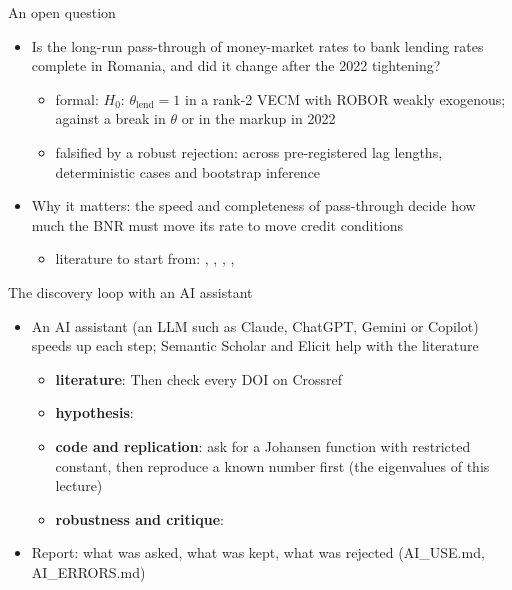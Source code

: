 \begin{frame}{An open question}
\itemsize{\small}
\begin{itemize}
    \item Is the long-run pass-through of money-market rates to bank lending rates complete in Romania, and did it change after the 2022 tightening?
    \begin{itemize}
        \item formal: $H_0$: $\theta_{\text{lend}} = 1$ in a rank-2 VECM with ROBOR weakly exogenous; against a break in $\theta$ or in the markup in 2022
        \item falsified by a robust rejection: across pre-registered lag lengths, deterministic cases and bootstrap inference
    \end{itemize}
    \item Why it matters: the speed and completeness of pass-through decide how much the BNR must move its rate to move credit conditions
    \begin{itemize}
        \item literature to start from: , , , , 
    \end{itemize}
\end{itemize}
\end{frame}

\begin{frame}{The discovery loop with an AI assistant}
\itemsize{\footnotesize}
\begin{itemize}
    \item An AI assistant (an LLM such as Claude, ChatGPT, Gemini or Copilot) speeds up each step; Semantic Scholar and Elicit help with the literature
    \begin{itemize}
        \item \textbf{literature}:  Then check every DOI on Crossref
        \item \textbf{hypothesis}: 
        \item \textbf{code and replication}: ask for a Johansen function with restricted constant, then reproduce a known number first (the eigenvalues of this lecture)
        \item \textbf{robustness and critique}: 
    \end{itemize}
    \item Report: what was asked, what was kept, what was rejected (AI\_USE.md, AI\_ERRORS.md)
\end{itemize}
\end{frame}

